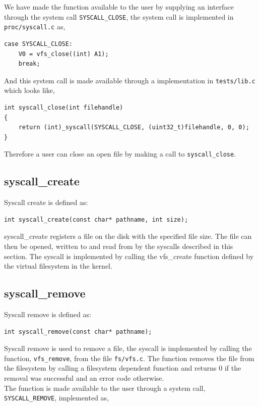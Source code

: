 \documentclass[11pt]{article}
\begin{document}
We have made the function available to the user by supplying an interface
through the system call \texttt{SYSCALL\_CLOSE}, the system call is implemented
in \texttt{proc/syscall.c} as,

\begin{lstlisting}[style=customc]
case SYSCALL_CLOSE:
    V0 = vfs_close((int) A1);
    break;
\end{lstlisting}

And this system call is made available through a implementation in
\texttt{tests/lib.c} which looks like,

\begin{lstlisting}[style=customc]
int syscall_close(int filehandle)
{
    return (int)_syscall(SYSCALL_CLOSE, (uint32_t)filehandle, 0, 0);
}
\end{lstlisting}

Therefore a user can close an open file by making a call to
\texttt{syscall\_close}.

\subsection{syscall\_create}
Syscall create is defined as:
    \begin{lstlisting}[style=customc]
int syscall_create(const char* pathname, int size);
    \end{lstlisting}
syscall\_create registers a file on the disk with the specified file size. The file can then be opened, written to and read from by the syscalls described in this section.
The syscall is implemented by calling the vfs\_create function defined by the virtual filesystem in the kernel.


\subsection{syscall\_remove}
Syscall remove is defined as:
    \begin{lstlisting}[style=customc]
int syscall_remove(const char* pathname);
    \end{lstlisting}
Syscall remove is used to remove a file, the syscall is implemented by calling
the function, \texttt{vfs\_remove}, from the file \texttt{fs/vfs.c}.  The
function removes the file from the filesystem by calling a filesystem dependent
function and returns 0 if the removal was successful and an error code
otherwise. \\

The function is made available to the user through a system call,
\texttt{SYSCALL\_REMOVE}, implemented as,
\end{document}
